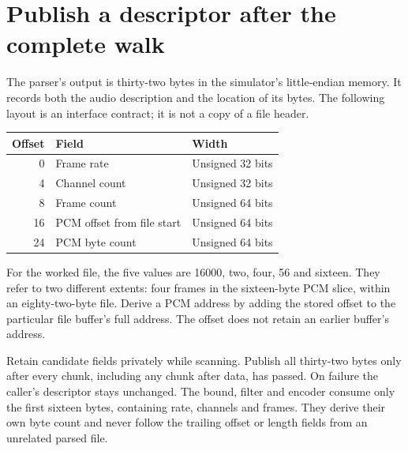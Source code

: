 \section{Publish a descriptor after the complete walk}
The parser's output is thirty-two bytes in the simulator's little-endian memory.
It records both the audio description and the location of its bytes. The following
layout is an interface contract; it is not a copy of a file header.

\begin{center}
  \begin{tabular}{rll}
    Offset & Field                      & Width            \\
    \hline
    0      & Frame rate                 & Unsigned 32 bits \\
    4      & Channel count              & Unsigned 32 bits \\
    8      & Frame count                & Unsigned 64 bits \\
    16     & PCM offset from file start & Unsigned 64 bits \\
    24     & PCM byte count             & Unsigned 64 bits \\
  \end{tabular}
\end{center}

For the worked file, the five values are 16000, two, four, 56 and sixteen. They refer
to two different extents: four frames in the sixteen-byte PCM slice, within an
eighty-two-byte file. Derive a PCM address by adding the stored offset to the particular
file buffer's full address. The offset does not retain an earlier buffer's address.

Retain candidate fields privately while scanning. Publish all thirty-two bytes only
after every chunk, including any chunk after data, has passed. On failure the caller's
descriptor stays unchanged. The bound, filter and encoder consume only the first
sixteen bytes, containing rate, channels and frames. They derive their own byte count
and never follow the trailing offset or length fields from an unrelated parsed file.
